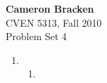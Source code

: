 \documentclass[11pt,twoside]{article}
\begin{document}
\thispagestyle{empty}
\textbf{Cameron Bracken}\\
CVEN 5313, Fall 2010\\
Problem Set 4


\begin{enumerate}

%
%
\item 
\begin{enumerate}

\item 
\end{enumerate}

\end{enumerate}
\end{document}
